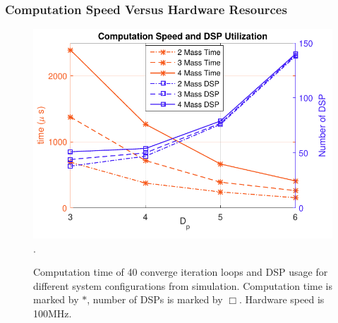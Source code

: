 \documentclass{beamer}
\begin{document}
\begin{frame}
\begin{columns}[c]

\end{columns}
\end{frame}

\begin{frame}
\frametitle{Computation Speed Versus Hardware Resources}
\begin{figure}[t]
\centering
\captionsetup{justification=centering}
\includegraphics[scale=.65]{../ASAP_17/figure/dsp.pdf}
\DeclareGraphicsExtensions.
\caption{Computation time of 40 converge iteration loops and DSP usage for different system configurations from simulation. Computation time is marked by $\ast$, number of DSPs is marked by $\Box$. Hardware speed is 100MHz.\label{fig_ct}}
\end{figure}

\end{frame}
\end{document}
